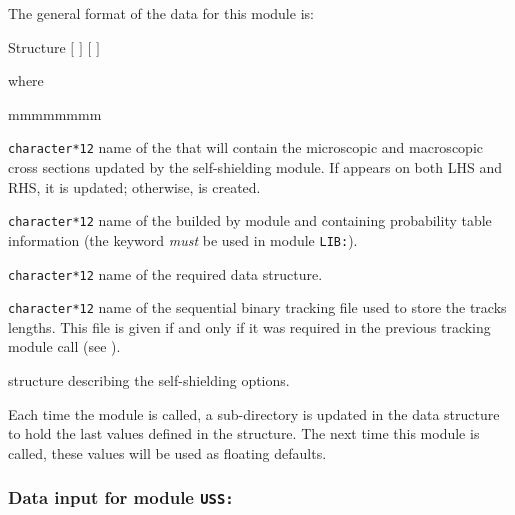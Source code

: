 \vskip 0.2cm

The general format of the data for this module is:

\begin{DataStructure}{Structure }
 \moc{:=}   $[$  $]$
 $[$  $]$ \moc{::} 
\end{DataStructure}

\noindent
where

\begin{ListeDeDescription}{mmmmmmmm}

\item[\dusa{MICLIB}] {\tt character*12} name of the  that will
contain the microscopic and macroscopic cross sections updated by the
self-shielding module. If
 appears on both LHS and RHS, it is updated; otherwise,
 is created.

\item[\dusa{MICLIB\_SG}] {\tt character*12} name of the  builded
by module  and containing probability table information (the keyword  {\sl must} be
used in module {\tt LIB:}).

\item[\dusa{TRKNAM}] {\tt character*12} name of the required 
data structure.

\item[\dusa{TRKFIL}] {\tt character*12} name of the sequential binary tracking
file used to store the tracks lengths. This file is given if and only if it was
required in the previous tracking module call (see ).

\item[\dstr{descuss}] structure describing the self-shielding options.

\end{ListeDeDescription}

Each time the  module is called, a sub-directory is updated in the
 data structure to hold the last values defined in the
 structure. The next time this module is called,
these values will be used as floating defaults.

\subsubsection{Data input for module {\tt USS:}}\label{sect:descuss}

